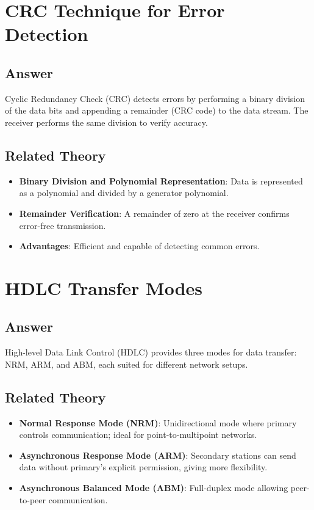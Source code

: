 \documentclass{article}
\begin{document}
\section{CRC Technique for Error Detection}
\subsection{Answer}
Cyclic Redundancy Check (CRC) detects errors by performing a binary division of the data bits and appending a remainder (CRC code) to the data stream. The receiver performs the same division to verify accuracy.

\subsection{Related Theory}
\begin{itemize}
    \item \textbf{Binary Division and Polynomial Representation}: Data is represented as a polynomial and divided by a generator polynomial.
    \item \textbf{Remainder Verification}: A remainder of zero at the receiver confirms error-free transmission.
    \item \textbf{Advantages}: Efficient and capable of detecting common errors.
\end{itemize}

\section{HDLC Transfer Modes}
\subsection{Answer}
High-level Data Link Control (HDLC) provides three modes for data transfer: NRM, ARM, and ABM, each suited for different network setups.

\subsection{Related Theory}
\begin{itemize}
    \item \textbf{Normal Response Mode (NRM)}: Unidirectional mode where primary controls communication; ideal for point-to-multipoint networks.
    \item \textbf{Asynchronous Response Mode (ARM)}: Secondary stations can send data without primary's explicit permission, giving more flexibility.
    \item \textbf{Asynchronous Balanced Mode (ABM)}: Full-duplex mode allowing peer-to-peer communication.
\end{itemize}
\end{document}
